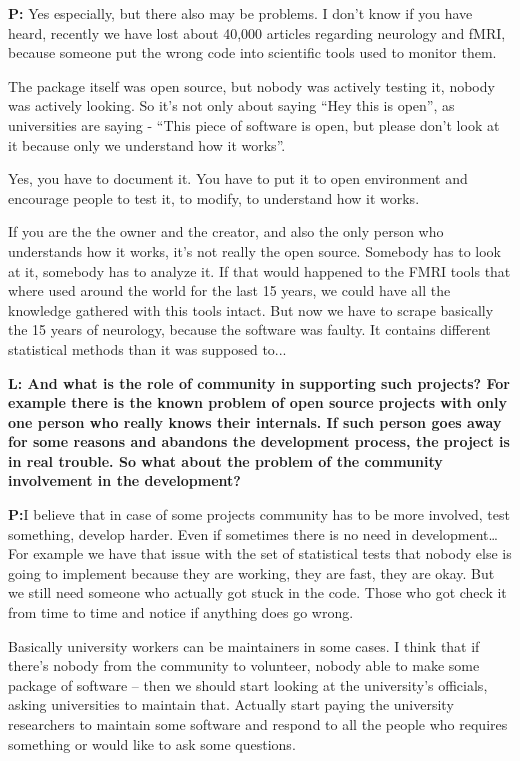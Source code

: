 \documentclass[10pt, a5paper]{article}
\begin{document}
\begin{Parallel}[p]{}{}
{{\noindent \bf P:} Yes especially, but there also may be problems. I don't know if you have heard, recently we have lost about 40,000 articles regarding neurology and fMRI, because someone put the wrong code into scientific tools used to monitor them. 

The package itself was open source, but nobody was actively testing it, nobody was actively looking. So it's not only about saying “Hey this is open”, as universities are saying - “This piece of software is open, but please don't look at it because only we understand how it works”. 

Yes, you have to document it. You have to put it to open environment and encourage people to test it, to modify, to understand how it works.

If you are the the owner and the creator, and also the only person who understands how it works, it's not really the open source. Somebody has to look at it, somebody has to analyze it. If that would happened to the FMRI tools that where used around the world for the last 15 years, we could have all the knowledge gathered with this tools intact. But now we have to scrape basically the 15 years of neurology, because the software was faulty. It contains different statistical methods than it was supposed to...

{\noindent \bf L: And what is the role of community in supporting such projects? For example there is the known problem of open source projects with only one person who really knows their internals. If such person goes away for some reasons and abandons the development process, the project is in real trouble. So what about the problem of the community involvement in the development?}

{\noindent \bf P:}I believe that in case of some projects community has to be more involved, test something, develop harder. Even if sometimes there is no need in development… For example we have that issue with the set of statistical tests that nobody else is going to implement because they are working, they are fast, they are okay. But we still need someone who actually got stuck in the code. Those who got check it from time to time and notice if anything does go wrong. 

Basically university workers can be maintainers in some cases. I think that if there's nobody from the community to volunteer, nobody able to make some package of software – then we should start looking at the university's officials, asking universities to maintain that. Actually start paying the university researchers to maintain some software and respond to all the people who requires something or would like to ask some questions. 

}
\end{Parallel}
\end{document}
